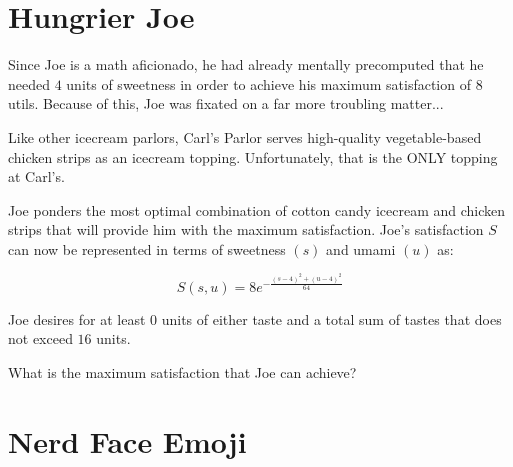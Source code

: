 
\setcounter{chapter}{2}
\chapter{Hungrier Joe}
Since Joe is a math aficionado, he had already mentally precomputed that he needed $4$ units of sweetness in order to achieve his maximum satisfaction of $8$ utils.
Because of this, Joe was fixated on a far more troubling matter...

Like other icecream parlors, Carl's Parlor serves high-quality vegetable-based chicken strips as an icecream topping.
Unfortunately, that is the ONLY topping at Carl's.

Joe ponders the most optimal combination of cotton candy icecream and chicken strips that will provide him with the maximum satisfaction.
Joe's satisfaction $S$ can now be represented in terms of sweetness $(s)$ and umami $(u)$ as:\par
\Large
\begin{equation}
	S(s, u) = 8e^{-\frac{(s-4)^2+(u-4)^2}{64}}
\end{equation}
\normalsize
\begin{eg}
	Joe desires for at least $0$ units of either taste and a total sum of tastes that does not exceed $16$ units.
	
	What is the maximum satisfaction that Joe can achieve?
\end{eg}

\setcounter{chapter}{3}
\chapter{Nerd Face Emoji} %
